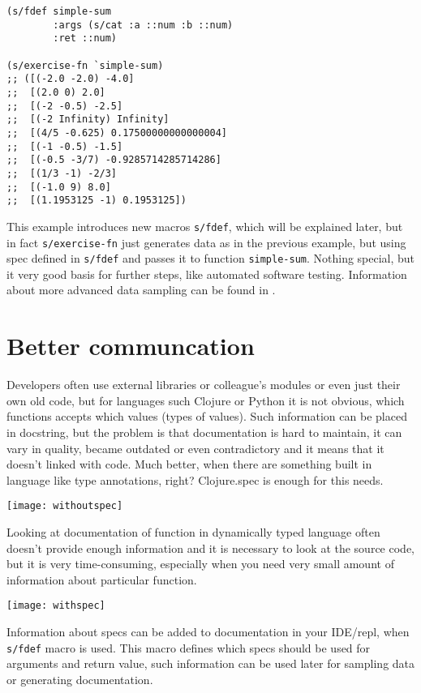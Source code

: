 \begin{verbatim}
(s/fdef simple-sum
        :args (s/cat :a ::num :b ::num)
        :ret ::num)

(s/exercise-fn `simple-sum)
;; ([(-2.0 -2.0) -4.0]
;;  [(2.0 0) 2.0]
;;  [(-2 -0.5) -2.5]
;;  [(-2 Infinity) Infinity]
;;  [(4/5 -0.625) 0.17500000000000004]
;;  [(-1 -0.5) -1.5]
;;  [(-0.5 -3/7) -0.9285714285714286]
;;  [(1/3 -1) -2/3]
;;  [(-1.0 9) 8.0]
;;  [(1.1953125 -1) 0.1953125])
\end{verbatim}

This example introduces new macros \texttt{s/fdef}, which will be explained
later, but in fact \texttt{s/exercise-fn} just generates data as in the previous
example, but using spec defined in \texttt{s/fdef} and passes it to function
\texttt{simple-sum}. Nothing special, but it very good basis for further steps,
like automated software testing. Information about more advanced data sampling
can be found in \cite{specific}.

\section{Better communcation}
\label{sec:bettercommunication}
Developers often use external libraries or colleague's modules or even just
their own old code, but for languages such Clojure or Python it is not obvious,
which functions accepts which values (types of values). Such information can be
placed in docstring, but the problem is that documentation is hard to maintain,
it can vary in quality, became outdated or even contradictory and it means that
it doesn't linked with code. Much better, when there are something built in
language like type annotations, right? Clojure.spec is enough for this needs.

\texttt{[image: withoutspec]}

Looking at documentation of function in dynamically typed language often doesn't
provide enough information and it is necessary to look at the source code, but
it is very time-consuming, especially when you need very small amount of
information about particular function.

\texttt{[image: withspec]}

Information about specs can be added to documentation in your IDE/repl, when
\texttt{s/fdef} macro is used. This macro defines which specs should be used for
arguments and return value, such information can be used later for sampling data
or generating documentation.

